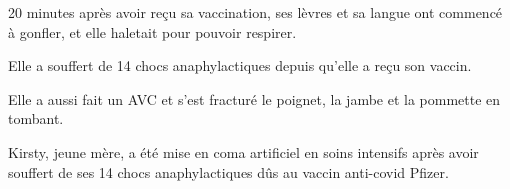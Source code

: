 20 minutes après avoir reçu sa vaccination, ses lèvres et sa langue ont commencé
à gonfler, et elle haletait pour pouvoir respirer.

Elle a souffert de 14 chocs anaphylactiques depuis qu'elle a reçu son vaccin.

Elle a aussi fait un AVC et s'est fracturé le poignet, la jambe et la pommette
en tombant.

Kirsty, jeune mère, a été mise en coma artificiel en soins intensifs après avoir
souffert de ses 14 chocs anaphylactiques dûs au vaccin anti-covid Pfizer.

